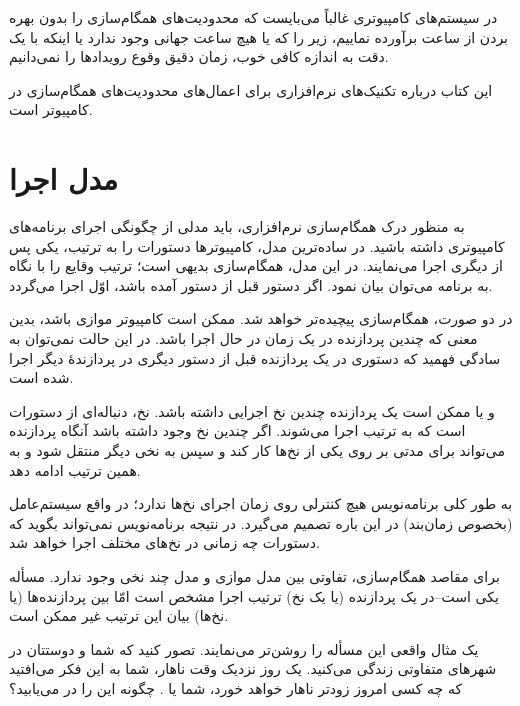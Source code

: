\documentclass{book}
\begin{document}
    در سیستم‌های کامپیوتری غالباً می‌بایست که محدودیت‌های همگام‌سازی را بدون بهر‌ه بردن از ساعت بر‌آورده نماییم، 
    زیر را که یا هیچ ساعت جهانی وجود ندارد یا اینکه با یک دقت به اندازه کافی خوب، زمان دقیق وقوع رویدادها را نمی‌دانیم.

    این کتاب درباره تکنیک‌های نرم‌افزاری برای اعمال‌های محدودیت‌های همگام‌سازی در کامپیوتر است.



\section {مدل اجرا}

    به منظور درک همگام‌سازی نرم‌افزاری، باید مدلی از چگونگی اجرای برنامه‌های کامپیوتری داشته باشید.
    در ساده‌ترین مدل، کامپیوترها دستورات را به ترتیب، یکی پس از دیگری اجرا می‌نمایند. 
    در این مدل، همگام‌سازی بدیهی است؛‌ ترتیب وقایع را با نگاه به  برنامه می‌توان بیان نمود. 
    اگر دستور  قبل از دستور  آمده باشد، اوّل اجرا می‌گردد. 

    در دو صورت، همگام‌سازی پیچیده‌تر خواهد شد. 
    ممکن است کامپیوتر موازی باشد، بدین معنی که چندین پردازنده در یک زمان در حال اجرا باشد. 
    در این حالت نمی‌توان به سادگی فهمید که 
    دستوری در یک پردازنده قبل از دستور دیگری در پردازندهٔ دیگر اجرا شده است. 

    و یا ممکن است یک پردازنده چندین نخ  اجرایی داشته باشد. نخ، دنباله‌ای از دستورات است که به ترتیب اجرا می‌شوند. 
    اگر چندین نخ وجود داشته باشد آنگاه پردازنده می‌تواند برای مدتی بر روی یکی  از نخ‌ها کار کند و سپس به نخی دیگر منتقل شود و به همین 
    ترتیب ادامه دهد. 

    به طور کلی برنامه‌نویس هیچ کنترلی روی زمان اجرای نخ‌ها ندارد؛ در واقع سیستم‌عامل (بخصوص زمان‌بند) در این باره تصمیم‌ می‌گیرد. 
    در نتیجه برنامه‌نویس نمی‌تواند بگوید که دستورات چه زمانی در نخ‌های مختلف اجرا خواهد شد.
    
    برای مقاصد همگام‌سازی، تفاوتی بین مدل موازی و مدل چند نخی وجود ندارد. 
    مسأله یکی است--در یک پردازنده (یا یک نخ) ترتیب اجرا مشخص است امّا بین پردازنده‌ها (یا نخ‌ها) بیان این ترتیب غیر ممکن است. 
    
    یک مثال واقعی این مسأله را روشن‌تر می‌نمایند. 
    تصور کنید که شما و دوستتان  در شهرهای متفاوتی زندگی می‌کنید. یک روز نزدیک وقت ناهار، شما به این فکر می‌افتید که 
    چه کسی امروز زودتر ناهار خواهد خورد، شما یا . چگونه این را در می‌یابید؟ 
\end{document}
